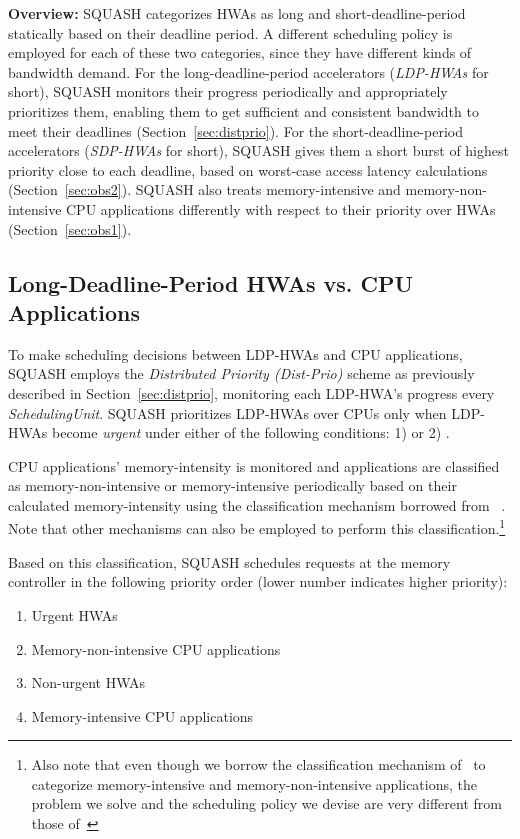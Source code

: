 \documentclass[10pt,letterpaper]{article}
\newcommand{\kevin}[1]{}
\begin{document}
\textbf{Overview:} SQUASH categorizes HWAs as long and short-deadline-period
statically based on their deadline period. \kevin{Based on what metric? And
why?}A different scheduling policy is employed for each of these two
categories, since they have different kinds of bandwidth demand. For the
long-deadline-period accelerators (\emph{LDP-HWAs} for short), SQUASH monitors
their progress periodically and appropriately prioritizes them, enabling them
to get sufficient and consistent bandwidth to meet their deadlines (Section~\ref{sec:distprio}). For the
short-deadline-period accelerators (\emph{SDP-HWAs} for short), SQUASH gives
them a short burst of highest priority close to each deadline, based on
worst-case access latency calculations (Section~\ref{sec:obs2}). SQUASH
also treats memory-intensive and memory-non-intensive CPU applications
differently with respect to their priority over HWAs (Section~\ref{sec:obs1}).

\subsection{Long-Deadline-Period HWAs vs. CPU Applications}
\label{sec:longdeadline}

To make scheduling decisions between LDP-HWAs and CPU applications, SQUASH
employs the \emph{Distributed Priority (Dist-Prio)} scheme as previously described
in Section~\ref{sec:distprio}, monitoring each LDP-HWA's progress every
\emph{SchedulingUnit}. SQUASH prioritizes LDP-HWAs over CPUs only when LDP-HWAs
become \emph{urgent} under either of the following conditions: 1)
 or 2)
.



CPU applications' memory-intensity is monitored and
applications are classified as memory-non-intensive or
memory-intensive periodically based on their calculated memory-intensity using
the classification mechanism borrowed from ~\cite{tcm}.
Note that other mechanisms can also be employed to perform this
classification.\footnote{Also note that even though we borrow the classification
mechanism of~\cite{tcm} to categorize memory-intensive and memory-non-intensive
applications, the problem we solve and the scheduling policy we devise are very
different from those of~\cite{tcm}}

Based on this classification, SQUASH schedules requests
at the memory controller in the following priority order (lower number
indicates higher priority):


\begin{enumerate}
\item{Urgent HWAs}
\item{Memory-non-intensive CPU applications}
\item{Non-urgent HWAs}
\item{Memory-intensive CPU applications}
\end{enumerate}
\end{document}
